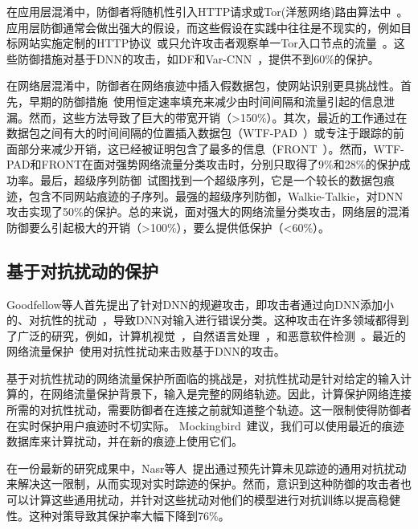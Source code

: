 \documentclass[degree=master,cjk-font=noto]{thuthesis}
\begin{document}
在应用层混淆中，防御者将随机性引入HTTP请求或Tor(洋葱网络)路由算法中~\cite{CherubinHayesJuarez,TrafficSliver}。应用层防御通常会做出强大的假设，而这些假设在实践中往往是不现实的，例如目标网站实施定制的HTTP协议~\cite{CherubinHayesJuarez}或只允许攻击者观察单一Tor入口节点的流量~\cite{TrafficSliver}。这些防御措施对基于DNN的攻击，如DF和Var-CNN~\cite{df,var-cnn}，提供不到60\%的保护。

在网络层混淆中，防御者在网络痕迹中插入假数据包，使网站识别更具挑战性。首先，早期的防御措施~\cite{cs-buflo,2660362}使用恒定速率填充来减少由时间间隔和流量引起的信息泄漏。然而，这些方法导致了巨大的带宽开销（>150\%）。其次，最近的工作通过在数据包之间有大的时间间隔的位置插入数据包（WTF-PAD~\cite{10.1007}）或专注于跟踪的前面部分来减少开销，这已经被证明包含了最多的信息（FRONT~\cite{247654}）。然而，WTF-PAD和FRONT在面对强势网络流量分类攻击时，分别只取得了9\%和28\%的保护成功率。最后，超级序列防御~\cite{glove,203876}试图找到一个超级序列，它是一个较长的数据包痕迹，包含不同网站痕迹的子序列。最强的超级序列防御，Walkie-Talkie，对DNN攻击实现了50\%的保护。总的来说，面对强大的网络流量分类攻击，网络层的混淆防御要么引起极大的开销（>100\%），要么提供低保护（<60\%）。

\subsection{基于对抗扰动的保护}

Goodfellow等人首先提出了针对DNN的规避攻击，即攻击者通过向DNN添加小的、对抗性的扰动~\cite{goodfellow2015explaining}，导致DNN对输入进行错误分类。这种攻击在许多领域都得到了广泛的研究，例如，计算机视觉~\cite{7958570,Chen_Sharma_Zhang_Yi_Hsieh_2018}，自然语言处理~\cite{HotFlip,10.1145/3374217}，和恶意软件检测~\cite{10.1007/978-3-319-66399-9_4,8844597}。最近的网络流量保护~\cite{9219593,9265277}使用对抗性扰动来击败基于DNN的攻击。

基于对抗性扰动的网络流量保护所面临的挑战是，对抗性扰动是针对给定的输入计算的，在网络流量保护背景下，输入是完整的网络轨迹。因此，计算保护网络连接所需的对抗性扰动，需要防御者在连接之前就知道整个轨迹。这一限制使得防御者在实时保护用户痕迹时不切实际。
Mockingbird~\cite{9265277}建议，我们可以使用最近的痕迹数据库来计算扰动，并在新的痕迹上使用它们。

在一份最新的研究成果中，Nasr等人~\cite{272174}提出通过预先计算未见踪迹的通用对抗扰动来解决这一限制，从而实现对实时踪迹的保护。然而，意识到这种防御的攻击者也可以计算这些通用扰动，并针对这些扰动对他们的模型进行对抗训练以提高稳健性。这种对策导致其保护率大幅下降到76\%。
\end{document}
